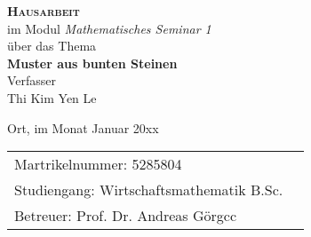 %
%
\begin{center}
  {\Huge {\bfseries\scshape Hausarbeit}}\\
  \vspace*{.5cm}
  {\Large im Modul \textit{Mathematisches Seminar 1}}\\
  \vspace*{2.cm}
  {\Large über das Thema}\linebreak\\
  {\huge {\bfseries Muster aus bunten Steinen}}\\
  \vspace*{2.75cm}
  {\Large Verfasser}\linebreak\\
  {\LARGE Thi Kim Yen Le}\\
\end{center}
\vspace*{2.cm}

{\Large Ort, im Monat Januar 20xx}
\vspace*{2.cm}

{\Large
  {\def\arraystretch{1}\tabcolsep=10pt %
    \begin{tabular}{@{}ll} %
      Martrikelnummer: 5285804 \\
      \rule{0pt}{3ex}%
      Studiengang: Wirtschaftsmathematik B.Sc.\\
      \rule{0pt}{3ex}%
      Betreuer: Prof. Dr. Andreas Görgcc
    \end{tabular}
  }
}
